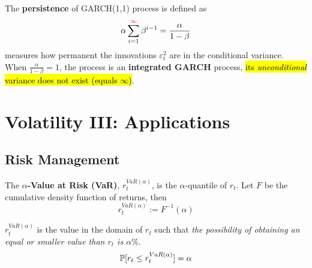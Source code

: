 \documentclass[11pt]{article}
\begin{document}
            \begin{definition}
                The \textbf{persistence} of GARCH(1,1) process is defined as
                \begin{equation}
                    \alpha \sum_{i=1}^{\textcolor{red}{\infty}} \beta^{i-1} = \frac{\alpha}{1 - \beta}
                \end{equation}
                measures how permanent the innovations $\varepsilon_t^2$ are in the conditional variance. When $\frac{\alpha}{1 - \beta} = 1$, the process is an \textbf{integrated GARCH} process, \hl{its \emph{unconditional} variance does not exist (equals $\infty$)}.
            \end{definition}
	        
	
	\section{Volatility III: Applications}
		\subsection{Risk Management}
			\begin{definition}
				The \textbf{$\alpha$-Value at Risk (VaR)}, $r_t^{VaR(\alpha)}$, is the $\alpha$-quantile of $r_t$. Let $F$ be the cumulative density function of returns, then
				\begin{equation}
					r_t^{VaR(\alpha)} := F^{-1}(\alpha)
				\end{equation}
			\end{definition}
			
			\begin{remark}[Interpretation]
				$r_t^{VaR(\alpha)}$ is the value in the domain of $r_t$ such that \emph{the possibility of obtaining an equal or smaller value than $r_t$ is $\alpha \%$}.
				\begin{equation}
					\mathbb{P}[{r_t \leq r_t^{VaR(\alpha)}}] = \alpha
				\end{equation}
			\end{remark}
	
\end{document}
